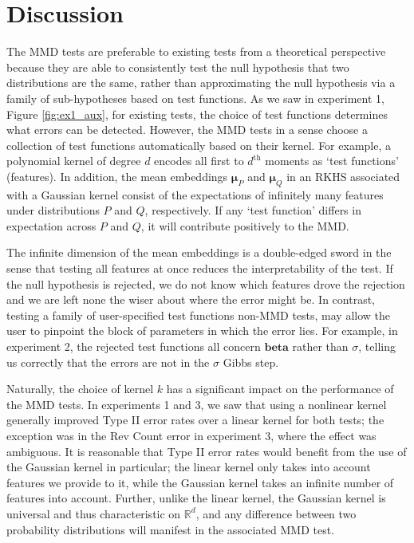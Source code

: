 \documentclass[a4paper,11pt]{article}
\begin{document}
\section{Discussion}
\label{section:discussion}
The MMD tests are preferable to existing tests from a theoretical perspective because they are able to consistently test the null hypothesis that two distributions are the same, rather than approximating the null hypothesis via a family of sub-hypotheses based on test functions. As we saw in experiment 1, Figure \ref{fig:ex1_aux}, for existing tests, the choice of test functions determines what errors can be detected. However, the MMD tests in a sense choose a collection of test functions automatically based on their kernel. For example, a polynomial kernel of degree $d$ encodes all first to $d^{\text{th}}$ moments as `test functions' (features). In addition, the mean embeddings $\mathbf{\mu}_{P}$ and $\mathbf{\mu}_{Q}$ in an RKHS associated with a Gaussian kernel consist of the expectations of infinitely many features under distributions $P$ and $Q$, respectively. If any `test function' differs in expectation across $P$ and $Q$, it will contribute positively to the MMD.

The infinite dimension of the mean embeddings is a double-edged sword in the sense that testing all features at once reduces the interpretability of the test. If the null hypothesis is rejected, we do not know which features drove the rejection and we are left none the wiser about where the error might be. In contrast, testing a family of user-specified test functions non-MMD tests, may allow the user to pinpoint the block of parameters in which the error lies. For example, in experiment 2, the rejected test functions all concern $\mathbf{beta}$ rather than $\sigma$, telling us correctly that the errors are not in the $\sigma$ Gibbs step.

Naturally, the choice of kernel $k$ has a significant impact on the performance of the MMD tests. In experiments 1 and 3, we saw that using a nonlinear kernel generally improved Type II error rates over a linear kernel for both tests; the exception was in the Rev Count error in experiment 3, where the effect was ambiguous. It is reasonable that Type II error rates would benefit from the use of the Gaussian kernel in particular; the linear kernel only takes into account features we provide to it, while the Gaussian kernel takes an infinite number of features into account. Further, unlike the linear kernel, the Gaussian kernel is universal and thus characteristic on $\mathbb{R}^{d}$, and any difference between two probability distributions will manifest in the associated MMD test.
\end{document}

